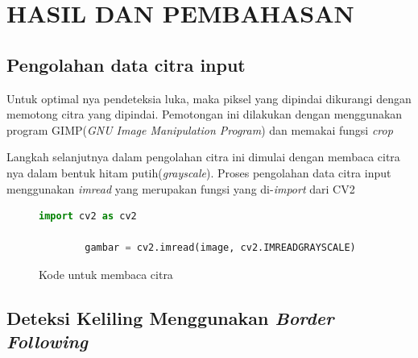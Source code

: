 
\chapter{HASIL DAN PEMBAHASAN}

\section{Pengolahan data citra input}

Untuk optimal nya pendeteksia luka, maka piksel 
yang dipindai dikurangi dengan memotong citra yang 
dipindai. Pemotongan ini dilakukan dengan menggunakan 
program GIMP(\textit{GNU Image Manipulation Program}) dan 
memakai fungsi \textit{crop} 

Langkah selanjutnya dalam pengolahan citra ini dimulai dengan 
membaca citra nya dalam bentuk hitam putih(\textit{grayscale}). 
Proses pengolahan data citra input menggunakan \textit{imread} yang merupakan 
fungsi yang di-\textit{import} dari CV2
\begin{figure}[H]
	\centering
	\begin{lstlisting}[language=Python, basicstyle=\tiny]
		import cv2 as cv2

		gambar = cv2.imread(image, cv2.IMREADGRAYSCALE)
	\end{lstlisting}
	\caption{Kode untuk membaca citra}
	\label{kode:imread}
\end{figure}

\section{Deteksi Keliling Menggunakan \textit{Border Following}}

